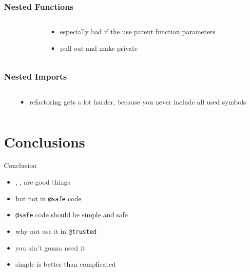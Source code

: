 \documentclass[aspectratio=169,notes]{beamer}
\begin{document}
	\begin{frame}[t]
		\frametitle{Nested Functions}
		\begin{columns}[T]
		\begin{column}{0.49\textwidth}
		
		\end{column}
		\begin{column}{0.49\textwidth}
		\pause
		\begin{itemize}
			\item especially bad if the use parent function parameters
			\item pull out and make private
		\end{itemize}
		\end{column}
		\end{columns}
			
	\end{frame}

	\begin{frame}[t]
		\frametitle{Nested Imports}
		\begin{columns}[T]
		\begin{column}{0.49\textwidth}
		
		\end{column}
		\begin{column}{0.49\textwidth}
		\pause
		\begin{itemize}
			\item refactoring gets a lot harder, because you never include all
				used symbols
		\end{itemize}
		\end{column}
		\end{columns}
	\end{frame}

	\section{Conclusions}
	\begin{frame}[fragile]{Conclusion}
		\begin{itemize}
		\item \lstinline@scope@, \lstinline@ref@, \lstinline@return@ are good things
		\pause
		\item but not in \lstinline|@safe| code
		\pause
		\item \lstinline|@safe| code should be simple and safe
		\pause
		\item why not use it in \lstinline|@trusted|
		\pause
		\item you ain't gonna need it
		\pause
		\item simple is better than complicated
		\end{itemize}
	\end{frame}
\end{document}
